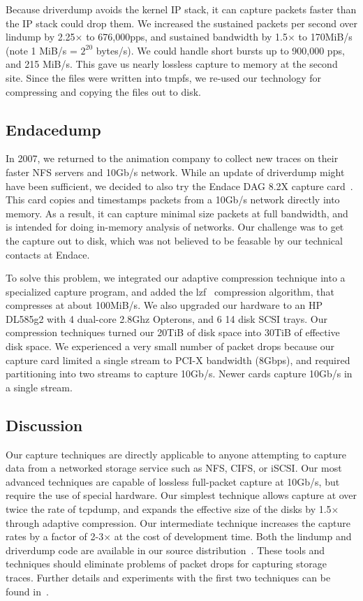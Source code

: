 Because driverdump avoids the kernel IP stack, it can
capture packets faster than the IP stack could drop them.
We increased the sustained packets per second over lindump by 2.25$\times$ to
676,000pps, and sustained bandwidth by 1.5$\times$ to 170MiB/s (note 1 MiB/s = $2^20$ bytes/s).  We could
handle short bursts up to 900,000 pps, and 215 MiB/s.  This gave us
nearly lossless capture to memory at the second site.  Since the files
were written into tmpfs, we re-used our technology for compressing and
copying the files out to disk.

\subsection{Endacedump}

In 2007, we returned to the animation company to collect new traces on
their faster NFS servers and 10Gb/s network.  While an update of
driverdump might have been sufficient, we decided to also try the
Endace DAG 8.2X capture card~\cite{endace-cards}.  This card copies
and timestamps packets from a 10Gb/s network directly into memory.  As
a result, it can capture minimal size packets at full bandwidth, and
is intended for doing in-memory analysis of networks.  Our challenge
was to get the capture out to disk, which was not believed to be
feasable by our technical contacts at Endace.

To solve this problem, we integrated our adaptive compression
technique into a specialized capture program, and added the
lzf~\cite{lzf} compression algorithm, that compresses at about
100MiB/s.  We also upgraded our hardware to an HP DL585g2 with 4 
dual-core 2.8Ghz Opterons, and 6 14 disk SCSI trays.  Our compression
techniques turned our 20TiB of disk space into 30TiB of effective disk
space.  We experienced a very small number of packet drops because our
capture card limited a single stream to PCI-X bandwidth (8Gbps), and
required partitioning into two streams to capture 10Gb/s.  Newer cards
capture 10Gb/s in a single stream.

\subsection{Discussion}

Our capture techniques are directly applicable to anyone attempting to
capture data from a networked storage service such as NFS, CIFS, or
iSCSI.  Our most advanced techniques are capable of lossless
full-packet capture at 10Gb/s, but require the use of special hardware.
Our simplest technique allows capture at over twice the rate of
tcpdump, and expands the effective size of the disks by 1.5$\times$ through
adaptive compression. Our intermediate technique increases the capture
rates by a factor of 2-3$\times$ at the cost of development time.  Both the
lindump and driverdump code are available in our source
distribution~\cite{DSOpenSource}.  These tools and techniques should
eliminate problems of packet drops for capturing storage traces.
Further details and
experiments with the first two techniques can be found
in~\cite{Anderson06network-tracing}.
